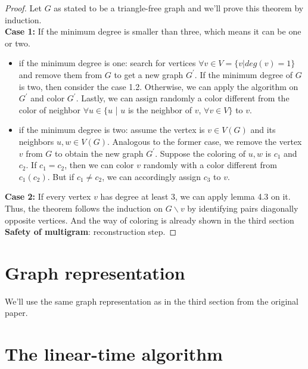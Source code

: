 \begin{proof}
Let $G$ as stated to be a triangle-free graph and we'll prove this theorem by induction.\\
\textbf{Case 1: } If the minimum degree is smaller than three, which means it can be one or two.
\begin{itemize}
    \item if the minimum degree is one: search for vertices $\forall v \in V = \{v | deg(v) = 1\}$ and remove them from $G$ to get a new graph $G^{'}$. If the minimum degree of $G$ is two, then consider the case 1.2. Otherwise, we can apply the algorithm on $G^{'}$ and color $G^{'}$. Lastly, we can assign randomly a color different from the color of neighbor $\forall u \in \{u$ | $u$ is the neighbor of $v$, $\forall v \in V \}$ to $v$. 
    
    \item if the minimum degree is two: assume the vertex is $v \in V(G)$ and its neighbors $u, w \in V(G)$. Analogous to the former case, we remove the vertex $v$ from $G$ to obtain the new graph $G^{'}$. Suppose the coloring of $u, w$ is $c_1$ and $c_2$. If $c_1 = c_2$, then we can color $v$ randomly with a color different from $c_1(c_2)$. But if $c_1 \ne c_2$, we can accordingly assign $c_3$ to $v$. 
\end{itemize}
\textbf{Case 2:}  If every vertex $v$ has degree at least 3, we can apply lemma 4.3 on it. Thus, the theorem follows the induction on $G \backslash v$ by identifying pairs diagonally opposite vertices. And the way of coloring is already shown in the third section \textbf{Safety of multigram}: reconstruction step. 

\end{proof}
\section{Graph representation}
We'll use the same graph representation as in the third section from the original paper. \cite{dvorak2013threecoloring}

\section{The linear-time algorithm}
